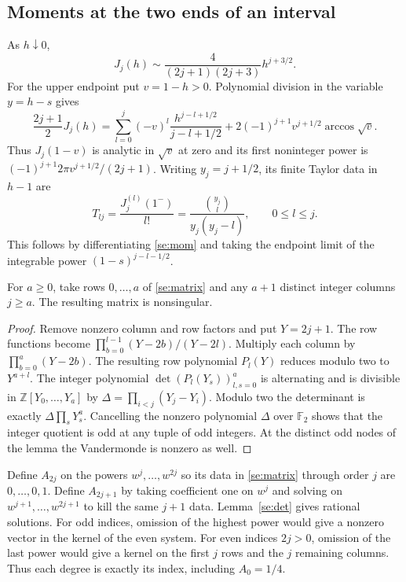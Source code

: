 \subsection{Moments at the two ends of an interval}
As \(h\downarrow0\),
\[
 J_j(h)\sim\frac{4}{(2j+1)(2j+3)}h^{j+3/2}.
\]
For the upper endpoint put \(v=1-h>0\). Polynomial division in the
variable \(y=h-s\) gives
\begin{equation}
 \frac{2j+1}{2}J_j(h)=
 \sum_{l=0}^{j}(-v)^l\frac{h^{j-l+1/2}}{j-l+1/2}
      +2(-1)^{j+1}v^{j+1/2}\arccos\sqrt v .                         \label{se:explicit}
\end{equation}
Thus \(J_j(1-v)\) is analytic in \(\sqrt v\) at zero and its first
noninteger power is
\((-1)^{j+1}2\pi v^{j+1/2}/(2j+1)\).
Writing \(y_j=j+1/2\), its finite Taylor data in \(h-1\) are
\begin{equation}
 T_{lj}=\frac{J_j^{(l)}(1^-)}{l!}
   =\frac{\binom{y_j}{l}}{y_j(y_j-l)},\qquad 0\le l\le j .          \label{se:matrix}
\end{equation}
This follows by differentiating \eqref{se:mom} and taking the endpoint
limit of the integrable power \((1-s)^{j-l-1/2}\).

\begin{lemma}\label{se:det}
For \(a\ge0\), take rows \(0,\ldots,a\) of \eqref{se:matrix} and any
\(a+1\) distinct integer columns \(j\ge a\). The resulting matrix is
nonsingular.
\end{lemma}
\begin{proof}
Remove nonzero column and row factors and put \(Y=2j+1\).
The row functions become
\(\prod_{b=0}^{l-1}(Y-2b)/(Y-2l)\).
Multiply each column by \(\prod_{b=0}^a(Y-2b)\).
The resulting row polynomial \(P_l(Y)\) reduces modulo two to
\(Y^{a+l}\). The integer polynomial
\(\det(P_l(Y_s))_{l,s=0}^a\) is alternating and is divisible in
\(\mathbb Z[Y_0,\ldots,Y_a]\) by
\(\Delta=\prod_{i<j}(Y_j-Y_i)\).
Modulo two the determinant is exactly
\(\Delta\prod_sY_s^a\). Cancelling the nonzero polynomial \(\Delta\)
over \(\mathbb F_2\) shows that the integer quotient is odd at any tuple
of odd integers. At the distinct odd nodes of the lemma the Vandermonde
is nonzero as well.
\end{proof}

Define \(A_{2j}\) on the powers \(w^j,\ldots,w^{2j}\) so its data in
\eqref{se:matrix} through order \(j\) are \(0,\ldots,0,1\).
Define \(A_{2j+1}\) by taking coefficient one on \(w^j\) and solving on
\(w^{j+1},\ldots,w^{2j+1}\) to kill the same \(j+1\) data.
Lemma~\ref{se:det} gives rational solutions. For odd indices, omission of
the highest power would give a nonzero vector in the kernel of the even
system. For even indices \(2j>0\), omission of the last power would give
a kernel on the first \(j\) rows and the \(j\) remaining columns. Thus
each degree is exactly its index, including \(A_0=1/4\).

